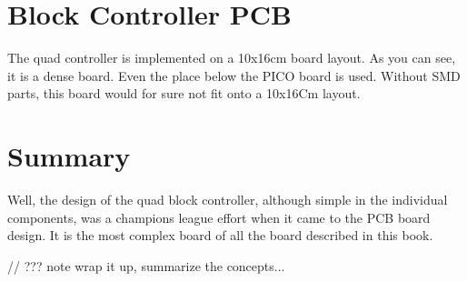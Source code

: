 \section{Block Controller PCB}

The quad controller is implemented on a 10x16cm board layout. As you can see, it is a dense board. Even the place below the PICO board is used. Without SMD parts, this board would for sure not fit onto a 10x16Cm layout.


\section{Summary}

Well, the design of the quad block controller, although simple in the individual components, was a champions league effort when it came to the PCB board design. It is the most complex board of all the board described in this book.

// ??? note wrap it up, summarize the concepts...


